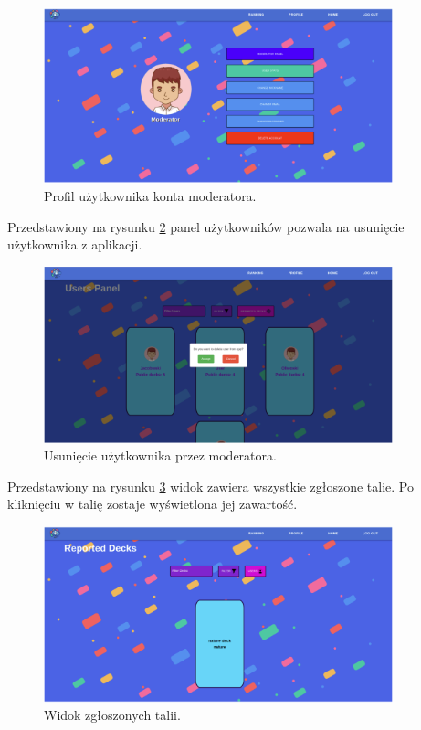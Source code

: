 \begin{figure}[H]
    \centering
    \includegraphics[width=0.9\textwidth]{chapters/chapter_10/images_web/web_moderator_profile}
    \caption{Profil użytkownika konta moderatora.}
    \label{img:web_moderator_profile}
\end{figure}

Przedstawiony na rysunku \ref{img:web_moderator_delete_user} panel użytkowników pozwala na usunięcie użytkownika z aplikacji.

\begin{figure}[H]
    \centering
    \includegraphics[width=0.9\textwidth]{chapters/chapter_10/images_web/web_moderator_delete_user}
    \caption{Usunięcie użytkownika przez moderatora.}
    \label{img:web_moderator_delete_user}
\end{figure}

Przedstawiony na rysunku \ref{img:web_reported_decks} widok zawiera wszystkie zgłoszone talie. Po kliknięciu w talię zostaje wyświetlona jej zawartość.

\begin{figure}[H]
    \centering
    \includegraphics[width=0.9\textwidth]{chapters/chapter_10/images_web/web_reported_decks}
    \caption{Widok zgłoszonych talii.}
    \label{img:web_reported_decks}
\end{figure}


